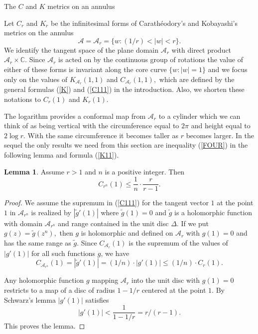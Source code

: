 \documentclass[12pt]{amsart}
\theoremstyle{remark}
\newcommand{\Car}{Carath\'eodory}
\theoremstyle{definition}
\theoremstyle{definition}
\newtheorem{lemma}{Lemma}
\begin{document}
\begin{section}{The $C$ and $K$ metrics on an annulus}

Let $C_r$ and $K_r$  be  the infinitesimal forms of  \Car's and Kobayashi's metrics on  the annulus $${\mathcal A}={\mathcal A}_r=\{w: (1/r) < |w| <r\}.$$ We identify the tangent space of the plane domain ${\mathcal A}_r$ with direct product ${\mathcal A}_r \times {\mathbb C}. $ Since ${\mathcal A}_r$ is acted on by the continuous group of rotations the value of either of these forms is invariant along the core curve  $\{w: |w|=1\}$ and we focus only on the values of  $K_{{\mathcal A}_r}(1,1)$ and $C_{{\mathcal A}_r}(1,1),$
which are defined by the general formulas (\ref{K}) and (\ref{C111}) in the introduction.
Also, we shorten these notations to $C_{r}(1)$ and $K_{r}(1).$
 
     The logarithm provides a conformal map from ${\mathcal A}_r$ to a cylinder which we can think of as being vertical with the circumference equal to $2 \pi$ and height equal to $2\log r.$ With the same circumference it becomes taller as $r$ becomes larger. 
      In the sequel the only results we need from this section are inequality (\ref{FOUR})  in the following lemma  and formula (\ref{K11}).
      
\begin{lemma}\label{Car'smetric} Assume $r>1$ and $n$ is a positive integer.  Then 
\begin{equation}\label{FOUR}C_{r^n}(1) \leq \frac{1}{n}  \cdot \frac{r}{r-1}.
\end{equation}
\end{lemma}
\begin{proof} 

We assume the supremum in (\ref{C111}) for the tangent vector $1$ at the point $1$ in ${\mathcal A}_{r^n}$ is realized by $|\tilde{g}'(1)|$ where $\tilde{g}(1)=0$ and $\tilde{g}$ is a holomorphic function with domain ${\mathcal A}_{r^n}$ and range contained in the unit disc $\Delta.$
If we put $g(z) = \tilde{g}(z^n),$ then $g$ is  holomorphic and defined on ${\mathcal A}_r$ with $g(1)=0$ and has the same range as $\tilde{g}.$  Since $C_{{\mathcal A}_{r}}(1)$ is the supremum of the values of $|g'(1)|$ for all such functions $g$, we have
\begin{equation}\label{180}C_{{\mathcal A}_{r^n}}(1) = |\tilde{g}'(1)| = (1/n) \cdot |g'(1)|  \leq (1/n) \cdot C_r(1).
\end{equation}

Any holomorphic function $g$ mapping ${\mathcal A}_r$ into the unit disc with $g(1)=0$ restricts to a map of a disc of radius $1-1/r$ centered at the point $1.$  By Schwarz's lemma $|g'(1)|$ satisfies 
$$ |g'(1)| < \frac{1}{1-1/r} = r/(r-1).$$
This proves the lemma.
\end{proof}




\end{section}
\end{document}
